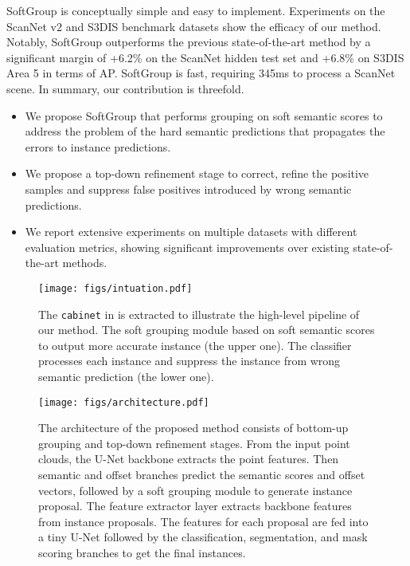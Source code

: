 \documentclass[10pt,twocolumn,letterpaper]{article}
\begin{document}
	SoftGroup is conceptually simple and easy to implement. Experiments on the ScanNet v2 \cite{dai2017scannet} and S3DIS \cite{armeni20163d} benchmark datasets show the efficacy of our method. Notably, SoftGroup outperforms the previous state-of-the-art method by a significant margin of +6.2\% on the ScanNet hidden test set and +6.8\% on S3DIS Area 5 in terms of AP. SoftGroup is fast, requiring 345ms to process a ScanNet scene. In summary, our contribution is threefold.
	\begin{itemize}[topsep=4pt]
\item We propose SoftGroup that performs grouping on soft semantic scores to address the problem of the hard semantic predictions that propagates the errors to instance predictions.
		\item We propose a top-down refinement stage to correct, refine the positive samples and suppress false positives introduced by wrong semantic predictions.
		\item We report extensive experiments on multiple datasets with different evaluation metrics, showing significant improvements over existing state-of-the-art methods.
	\end{itemize}
	


	\begin{figure}
		\centering
		\texttt{[image: figs/intuation.pdf]}
		\caption{The \texttt{cabinet} in  is extracted to illustrate the high-level pipeline of our method. The soft grouping module based on soft semantic scores to output more accurate instance (the upper one). The classifier processes each instance and suppress the instance from wrong semantic prediction (the lower one).}
		\label{fig:intuation}
	\end{figure}
	
	\begin{figure*}
		\centering
		\texttt{[image: figs/architecture.pdf]}
		\caption{The architecture of the proposed method consists of bottom-up grouping and top-down refinement stages. From the input point clouds, the U-Net backbone extracts the point features. Then semantic and offset branches predict the semantic scores and offset vectors, followed by a soft grouping module to generate instance proposal. The feature extractor layer extracts backbone features from instance proposals. The features for each proposal are fed into a tiny U-Net followed by the classification, segmentation, and mask scoring branches to get the final instances.}
		\label{fig:arch}
	\end{figure*}
	
\end{document}
